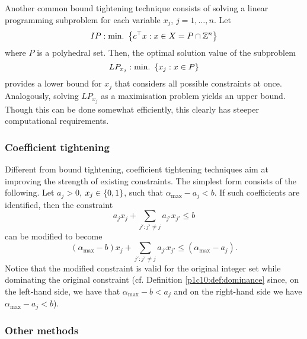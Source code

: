 Another common bound tightening technique consists of solving a linear programming subproblem for each variable $x_j$, $j =1, \dots, n$. Let
%
\begin{equation*}
	IP : \mathop{\text{min.~}} \left\{ c^\top x : x \in X = P \cap \mathbb{Z}^n \right \}		
\end{equation*}
%
where $P$ is a polyhedral set. Then, the optimal solution value of the subproblem
%
\begin{equation*}
	LP_{x_j} : \mathop{\text{min.~}} \left\{ x_j : x \in P \right \}		
\end{equation*}
%
provides a lower bound for $x_j$ that considers all possible constraints at once. Analogously, solving $LP_{x_j}$ as a maximisation problem yields an upper bound. Though this can be done somewhat efficiently, this clearly has steeper computational requirements. 

\subsubsection{Coefficient tightening}

Different from bound tightening, coefficient tightening techniques aim at improving the strength of existing constraints. The simplest form consists of the following. Let $a_j > 0$, $x_j \in \left\{ 0,1 \right \}$, such that $\alpha_{\text{max}} - a_j < b$. If such coefficients are identified, then the constraint 
%
\begin{equation*}
	a_jx_j + \sum_{j' : j' \neq j} a_{j'}x_{j'}\leq b
\end{equation*}
%
can be modified to become
%
\begin{equation*}
	(\alpha_{\text{max}} - b)x_j + \sum_{j' : j' \neq j} a_{j'}x_{j'} \leq (\alpha_{\text{max}} - a_j).
\end{equation*}
%
Notice that the modified constraint is valid for the original integer set while dominating the original constraint (cf. Definition \ref{p1c10:def:dominance} since, on the left-hand side, we have that $\alpha_{\text{max}} - b < a_j$ and on the right-hand side we have $\alpha_{\text{max}} - a_j < b$).


\subsubsection{Other methods}

